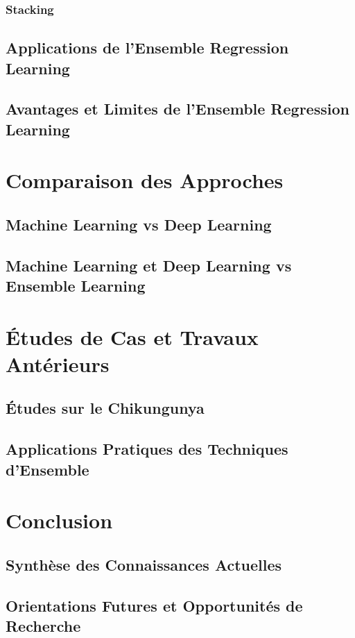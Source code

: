 \subsubsection{Stacking}
\subsection{Applications de l'Ensemble Regression Learning}
\subsection{Avantages et Limites de l'Ensemble Regression Learning}

\section{Comparaison des Approches}
\subsection{Machine Learning vs Deep Learning}
\subsection{Machine Learning et Deep Learning vs Ensemble Learning}

\section{Études de Cas et Travaux Antérieurs}
\subsection{Études sur le Chikungunya}
\subsection{Applications Pratiques des Techniques d'Ensemble}

\section{Conclusion}
\subsection{Synthèse des Connaissances Actuelles}
\subsection{Orientations Futures et Opportunités de Recherche}